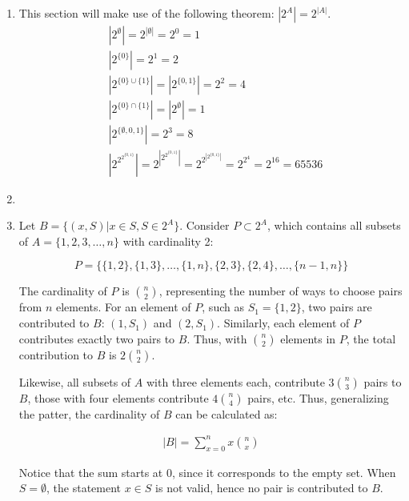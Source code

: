 \documentclass[12pt]{article}
\newcommand{\p}[1]{\item[\textnormal{(#1)}]}
\newenvironment{ps}
{\begin{enumerate}[leftmargin=0em, itemindent=1.5em]}
{\end{enumerate}}
\begin{document}
\begin{ps}
    \p{a} This section will make use of the following theorem: \( |2^A| = 2^{|A|} \).
    \begin{align*}
        & |2^\emptyset| = 2^{|\emptyset|} = 2^0 = 1 \\
        & |2^{\{0\}}| = 2^1 = 2 \\
        & |2^{\{0\} \cup \{1\}}| = |2^{\{0,1\}}| = 2^2 = 4 \\
        & |2^{\{0\} \cap \{1\}}| = |2^\emptyset| = 1 \\
        & |2^{\{\emptyset, 0, 1\}}| = 2^3 = 8 \\
        &\left|2^{2^{2^{\{0,1\}}}}\right| = 2^{\left|2^{2^{\{0, 1\}}}\right|} 
        = 2^{2^{\left| 2^{\{0, 1\}}\right|}} = 2^{2^4} = 2^{16} = 65536
    \end{align*}

    \p{b}

    \p{i} Let \( B = \{(x, S) | x \in S, S \in 2^A \}\). Consider \( P \subset 2^A \), which
    contains all subsets of \( A = \{1, 2, 3, \ldots, n\} \) with cardinality 2:

    \[
        P = \{ \{1, 2\}, \{1,3\}, \ldots, \{1, n\}, \{2, 3\}, \{2, 4\}, \ldots, \{n-1, n\} \}
    \]

    The cardinality of \( P \) is \( \binom{n}{2} \), representing the number of ways to choose
    pairs from \( n \) elements. For an element of \( P \), such as \( S_1 = \{1,2\}\), two pairs
    are contributed to \( B \): \( (1, S_1) \) and \( (2, S_1) \). Similarly, each element of \( P
    \) contributes exactly two pairs to \( B \). Thus, with \( \binom{n}{2} \) elements in \( P \),
    the total contribution to \( B \) is \( 2 \binom{n}{2} \). \par

    Likewise, all subsets of \( A \) with three elements each, contribute \( 3 \binom{n}{3} \) pairs
    to \( B \), those with four elements contribute \( 4 \binom{n}{4} \) pairs, etc. Thus,
    generalizing the patter, the cardinality of \( B \) can be calculated as: 

    \begin{align} \label{card_B} 
        |B| = \sum_{x=0}^{n} x\binom{n}{x} 
    \end{align}

    Notice that the sum starts at 0, since it corresponds to the empty set. When \( S = \emptyset
    \), the statement \( x \in S \) is not valid, hence no pair is contributed to \( B \).


\end{ps}
\end{document}
